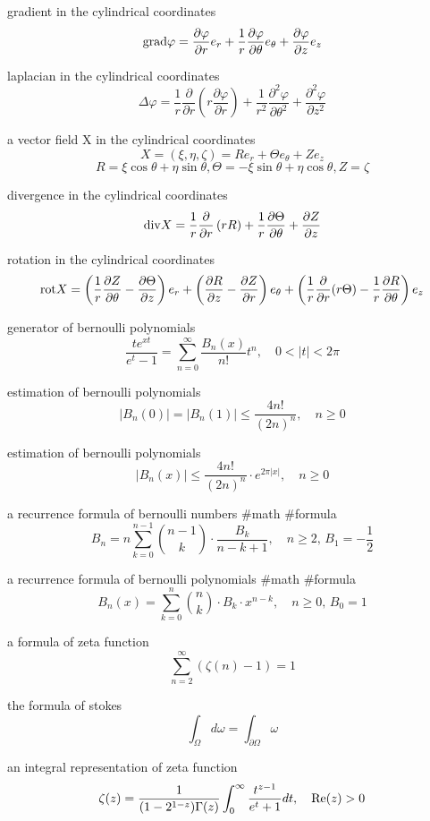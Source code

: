 gradient in the cylindrical coordinates
$$
{\rm grad} \varphi = \frac{\partial \varphi}{\partial r}e_r+\frac{1}{r}\frac{\partial \varphi}{\partial \theta}e_\theta+\frac{\partial \varphi}{\partial z}e_z
$$

laplacian in the cylindrical coordinates
$$
\Delta \varphi = \frac{1}{r}\frac{\partial}{\partial r}\left(r\frac{\partial \varphi}{\partial r}\right)+\frac{1}{r^2}\frac{\partial^2 \varphi}{\partial \theta^2}+\frac{\partial^2 \varphi}{\partial z^2}
$$

a vector field X in the cylindrical coordinates 
$$
X=(\xi,\eta,\zeta)=R e_r+\Theta e_\theta+Z e_z
$$
$$
R=\xi\cos\theta+\eta\sin\theta,\Theta=-\xi\sin\theta+\eta\cos\theta,Z=\zeta
$$

divergence in the cylindrical coordinates
$$
{\rm div} X = \frac{1}{r}\frac{\partial}{\partial r}\left(r R\right)+\frac{1}{r}\frac{\partial \Theta}{\partial \theta}+\frac{\partial Z}{\partial z}
$$

rotation in the cylindrical coordinates
$$
{\rm rot} X = \left(\frac{1}{r}\frac{\partial Z}{\partial \theta}-\frac{\partial \Theta}{\partial z}\right)e_r+
\left(\frac{\partial R}{\partial z}-\frac{\partial Z}{\partial r}\right)e_\theta+
\left(\frac{1}{r}\frac{\partial}{\partial r}(r\Theta)-\frac{1}{r}\frac{\partial R}{\partial \theta}\right)e_z
$$

generator of bernoulli polynomials
$$
\frac{t e^{xt}}{e^t-1}=\sum^\infty_{n=0}\frac{B_n(x)}{n!}t^n, \quad 0<|t|<2\pi
$$

estimation of bernoulli polynomials
$$
|B_n(0)|=|B_n(1)| \le \frac{4n!}{(2n)^n}, \quad n \ge 0
$$

estimation of bernoulli polynomials
$$
|B_n(x)| \le \frac{4n!}{(2n)^n}\cdot e^{2\pi|x|}, \quad n \ge 0
$$

a recurrence formula of bernoulli numbers #math #formula 
$$
B_n=n\sum^{n-1}_{k=0}\binom{n-1}{k}\cdot\frac{B_k}{n-k+1},\quad n \ge 2,\, B_1=-\frac{1}{2}
$$

a recurrence formula of bernoulli polynomials #math #formula
$$
B_n(x)=\sum^n_{k=0}\binom{n}{k}\cdot B_k\cdot x^{n-k},\quad n\ge 0,\,B_0=1
$$

a formula of zeta function
$$
\sum^\infty_{n=2}\left(\zeta(n)-1\right)=1
$$

the formula of stokes
$$
\int_\Omega d\omega=\int_{\partial\Omega}\omega
$$

an integral representation of zeta function
$$
\zeta(z)=\frac{1}{(1-2^{1-z})\Gamma(z)}\int^\infty_0\frac{t^{z-1}}{e^t+1}dt, \quad {\rm Re}(z)>0
$$

